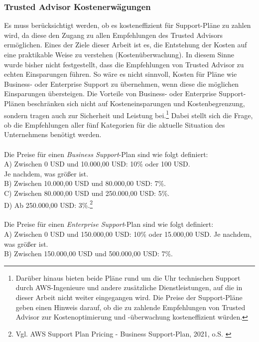 \subsubsection*{Trusted Advisor Kostenerwägungen}
Es muss berücksichtigt werden, ob es kosteneffizient für Support-Pläne zu zahlen wird, da diese den Zugang zu allen Empfehlungen des Trusted Advisors ermöglichen. Eines der Ziele dieser Arbeit ist es, die Entstehung der Kosten auf eine praktikable Weise zu verstehen (Kostenüberwachung). In diesem Sinne wurde bisher nicht festgestellt, dass die Empfehlungen von Trusted Advisor zu echten Einsparungen führen. %
So wäre es nicht sinnvoll, Kosten für Pläne wie Business- oder Enterprise Support zu übernehmen, wenn diese die möglichen Einsparungen übersteigen. Die Vorteile von Business- oder Enterprise Support-Plänen beschränken sich nicht auf Kosteneinsparungen und Kostenbegrenzung, sondern tragen auch zur Sicherheit und Leistung bei.\footnote{Darüber hinaus bieten beide Pläne rund um die Uhr technischen Support durch AWS-Ingenieure und andere zusätzliche Dienstleistungen, auf die in dieser Arbeit nicht weiter eingegangen wird. Die Preise der Support-Pläne geben einen Hinweis darauf, ob die zu zahlende Empfehlungen von Trusted Advisor zur Kostenoptimierung und -überwachung kosteneffizient würden.} Dabei stellt sich die Frage, ob die Empfehlungen aller fünf Kategorien für die aktuelle Situation des Unternehmens benötigt werden.
\\\\   
Die Preise für einen \textit{Business Support}-Plan sind wie folgt definiert: 
\\
A) Zwischen 0 USD und 10.000,00 USD: 10\% oder 100 USD. \\
Je nachdem, was größer ist.\\
B) Zwischen 10.000,00 USD und 80.000,00 USD: 7\%.\\
C) Zwischen 80.000,00 USD und 250.000,00 USD: 5\%.\\
D) Ab 250.000,00 USD: 3\%.\footnote{Vgl.  AWS Support Plan Pricing - Business Support-Plan, 2021, o.S. \cite{AMZ38}}
\\\\
Die Preise für einen \textit{Enterprise Support}-Plan sind wie folgt definiert:
\\
A) Zwischen 0 USD und 150.000,00 USD: 10\% oder 15.000,00 USD. Je nachdem, was größer ist.\\
B) Zwischen 150.000,00 USD und 500.000,00 USD: 7\%.\\
